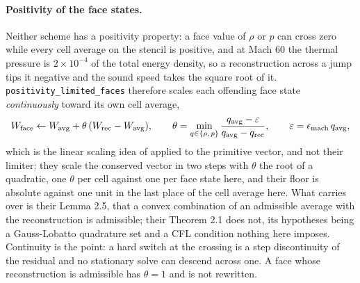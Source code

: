 \paragraph{Positivity of the face states.}
Neither scheme has a positivity property: a face value of $\rho$ or $p$ can
cross zero while every cell average on the stencil is positive, and at Mach
60 the thermal pressure is $2\times10^{-4}$ of the total energy density, so a
reconstruction across a jump tips it negative and the sound speed takes the
square root of it.  \texttt{positivity\_limited\_faces} therefore scales each
offending face state \emph{continuously} toward its own cell average,
%
\begin{equation}
  W_{\rm face} \leftarrow W_{\rm avg} + \theta\,(W_{\rm rec} - W_{\rm avg}),
  \qquad
  \theta = \min_{q \in \{\rho,\,p\}}
           \frac{q_{\rm avg} - \varepsilon}{q_{\rm avg} - q_{\rm rec}},
  \qquad \varepsilon = \epsilon_{\rm mach}\,q_{\rm avg},
  \label{eq:posface}
\end{equation}
%
which is the linear scaling idea of \citet{Zhang2010} applied to the
primitive vector, and not their limiter: they scale the conserved vector in
two steps with $\theta$ the root of a quadratic, one $\theta$ per cell against
one per face state here, and their floor is absolute against one unit in the
last place of the cell average here.  What carries over is their Lemma 2.5,
that a convex combination of an admissible average with the reconstruction is
admissible; their Theorem 2.1 does not, its hypotheses being a Gauss-Lobatto
quadrature set and a CFL condition nothing here imposes.  Continuity is the
point: a hard switch at the crossing is a step discontinuity of the residual
and no stationary solve can descend across one.  A face whose reconstruction
is admissible has $\theta = 1$ and is not rewritten.

